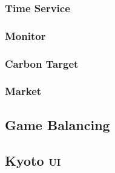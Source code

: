 \documentclass[]{article} %
\begin{document}
\subsubsection{Time Service}

\subsubsection{Monitor}

\subsubsection{Carbon Target}

\subsubsection{Market}

\subsection{Game Balancing}


\subsection{Kyoto \textsc{ui}}
{}

\end{document}
